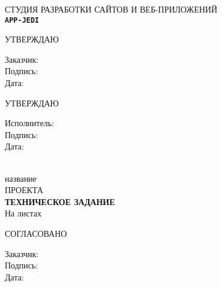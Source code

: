 %
\begin{center}
{\Large {{СТУДИЯ РАЗРАБОТКИ САЙТОВ И ВЕБ-ПРИЛОЖЕНИЙ \\ \texttt{\LARGE \bf APP-JEDI}}}}\\[1cm]

\begin{minipage}{\textwidth}
  \begin{minipage}{0.5\textwidth}
    \begin{flushleft}
      \begin{center}
        {\large УТВЕРЖДАЮ}\\
      \end{center}
      Заказчик: \\
      Подпись:\\
      Дата:
    \end{flushleft}
  \end{minipage}
  \begin{minipage}{0.5\textwidth}
    \begin{flushleft}
      \begin{center}
        {\large УТВЕРЖДАЮ}\\
      \end{center}
      Исполнитель:\\
      Подпись:\\
      Дата:
    \end{flushleft}
  \end{minipage}
\end{minipage}
\\[4cm]
{\huge название} \\ %
{\LARGE ПРОЕКТА } \\[0.5cm]
{ \Huge \bf ТЕХНИЧЕСКОЕ ЗАДАНИЕ }\\[1.5cm]

На \pageref{LastPage} листах\\[2cm]
\begin{flushleft}
\begin{minipage}{0.5\textwidth}
\begin{center}
  СОГЛАСОВАНО
\end{center}
    Заказчик: \\
    Подпись:\\
    Дата:
\end{minipage}
\end{flushleft}
\end{center}
\thispagestyle{empty}
